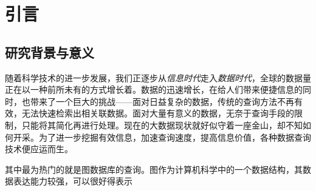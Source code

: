 \documentclass{XDBAthesis}
\begin{document}
\else
\fi
\chapter{引言}
\label{chap:introduction}
\section{研究背景与意义}
随着科学技术的进一步发展，我们正逐步从\emph{信息时代}走入\emph{数据时代}\cite{BigData}，全球的数据量正在以一种前所未有的方式增长着。数据的迅速增长，在给人们带来便捷信息的同时，也带来了一个巨大的挑战——面对日益复杂的数据，传统的查询方法不再有效，无法快速检索出相关联数据。面对大量有意义的数据，无奈于查询手段的限制，只能将其简化再进行处理。现在的大数据现状就好似守着一座金山，却不知如何开采。为了进一步挖掘有效信息，加速查询速度，提高信息价值，各种数据查询技术便应运而生。

其中最为热门的就是图数据库的查询。图作为计算机科学中的一个数据结构，其数据表达能力较强，可以很好得表示

\ifx\allfiles\undefined
\renewcommand\refname{参考文献}


\end{document}
